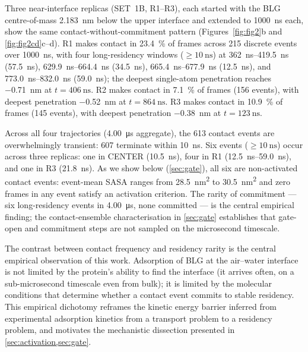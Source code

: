 \documentclass[11pt,a4paper]{article}
\begin{document}
Three near-interface replicas (SET~1B, R1--R3), each started with the
BLG centre-of-mass \SI{2.183}{\nano\metre} below the upper interface and
extended to \SI{1000}{\nano\second} each, show the same
contact-without-commitment pattern (Figures~\ref{fig:fig2}b and \ref{fig:fig2cd}c--d). R1 makes contact in \SI{23.4}{\percent}
of frames across \num{215} discrete events over \SI{1000}{\nano\second},
with four long-residency windows ($\geq\SI{10}{\nano\second}$) at
\SIrange{362}{419.5}{\nano\second} (\SI{57.5}{\nano\second}),
\SIrange{629.9}{664.4}{\nano\second} (\SI{34.5}{\nano\second}),
\SIrange{665.4}{677.9}{\nano\second} (\SI{12.5}{\nano\second}), and
\SIrange{773.0}{832.0}{\nano\second} (\SI{59.0}{\nano\second}); the
deepest single-atom penetration reaches \SI{-0.71}{\nano\metre} at
$t = \SI{406}{\nano\second}$.
R2 makes contact in \SI{7.1}{\percent} of frames (\num{156} events), with
deepest penetration \SI{-0.52}{\nano\metre} at $t = \SI{864}{\nano\second}$.
R3 makes contact in \SI{10.9}{\percent} of frames (\num{145} events), with
deepest penetration \SI{-0.38}{\nano\metre} at $t = \SI{123}{\nano\second}$.

Across all four trajectories (\SI{4.00}{\micro\second} aggregate), the
\num{613} contact events are overwhelmingly transient: \num{607} terminate
within \SI{10}{\nano\second}. Six events ($\geq\SI{10}{\nano\second}$)
occur across three replicas: one in CENTER (\SI{10.5}{\nano\second}),
four in R1 (\SIrange{12.5}{59.0}{\nano\second}), and one in R3
(\SI{21.8}{\nano\second}). As we show below (\cref{sec:gate}), all six are non-activated contact
events: event-mean SASA ranges from \SI{28.5}{\nano\metre\squared} to
\SI{30.5}{\nano\metre\squared} and zero frames in any event satisfy an
activation criterion. The rarity of commitment --- six long-residency
events in \SI{4.00}{\micro\second}, none committed --- is the central
empirical finding; the contact-ensemble characterisation in \cref{sec:gate}
establishes that gate-open and commitment steps are not sampled on the
microsecond timescale.

The contrast between contact frequency and residency rarity is the
central empirical observation of this work. Adsorption of BLG at the
air--water interface is not limited by the protein's ability to find
the interface (it arrives often, on a sub-microsecond timescale even
from bulk); it is limited by the molecular conditions that determine
whether a contact event commits to stable residency. This empirical
dichotomy reframes the kinetic energy barrier inferred from
experimental adsorption kinetics\citep{Cornec1999,Ulaganathan2017a} from
a transport problem to a residency problem, and motivates the
mechanistic dissection presented in \cref{sec:activation,sec:gate}.
\end{document}
